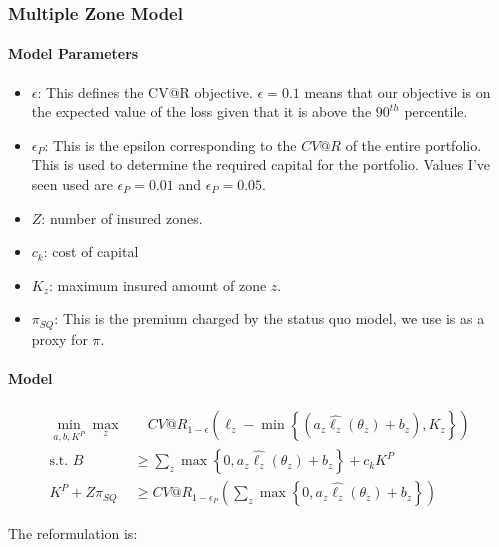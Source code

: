 \documentclass[11pt]{article}
\begin{document}
    \subsubsection*{Multiple Zone Model}
    \paragraph*{Model Parameters}
        \begin{itemize}
            \item $\epsilon$: This defines the CV@R objective. $\epsilon = 0.1$ means that our objective is on the expected value of the loss given that it is above the $90^{th}$ percentile. 
            \item $\epsilon_P$: This is the epsilon corresponding to the $CV@R$ of the entire portfolio. This is used to determine the required capital for the portfolio. Values I've seen used are $\epsilon_P=0.01$ and $\epsilon_P=0.05$. 
            \item $Z$: number of insured zones.
            \item $c_k$: cost of capital
            \item $K_z$: maximum insured amount of zone $z$.
            \item $\pi_{SQ}$: This is the premium charged by the status quo model, we use is as a proxy for $\pi$.  
        \end{itemize}

    \paragraph*{Model}
    \begin{align}
        \min_{a,b,K^P} \max_z &\quad CV@R_{1-\epsilon}(\ell_z - \min \left \{ (a_z\hat{\ell_z}(\theta_z) + b_z), K_z \right \})\\
        \text{s.t.   } B &\geq \sum_z \max \left \{ 0, a_z\hat{\ell_z}(\theta_z) + b_z \right \} + c_k K^P\\
        K^P + Z\pi_{SQ} &\geq CV@R_{1-\epsilon_P} \left( \sum_z \max \left \{ 0,a_z\hat{\ell_z}(\theta_z) + b_z \right \} \right )
    \end{align}
    
    The reformulation is: 
    
\end{document}
